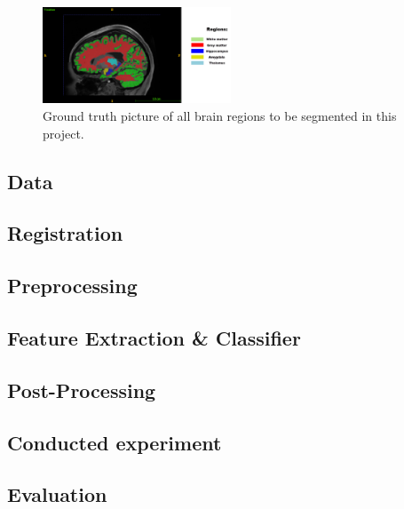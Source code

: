 \documentclass[journal]{IEEEtran}
\begin{document}
	\begin{figure}[h]
		\centering
		\includegraphics[width=0.5\textwidth]{T1native_all_regions_labelled.png}
		\caption{Ground truth picture of all brain regions to be segmented in this project.}
		\label{fig:e1}
	\end{figure}

\subsection{Data}

		
\subsection{Registration}
	
	
\subsection{Preprocessing}

	

\subsection{Feature Extraction \& Classifier} 

	
	
\subsection{Post-Processing} 
 
	
	
\subsection{Conducted experiment}


\subsection{Evaluation}
\end{document}
